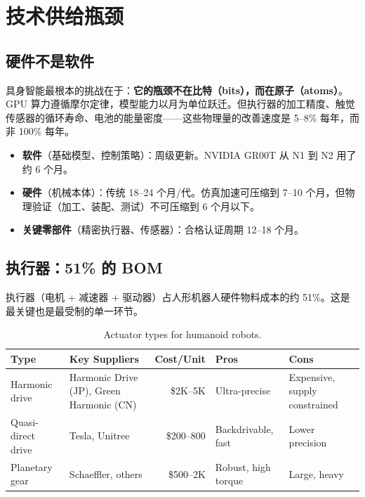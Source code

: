 \chapter{技术供给瓶颈}
\label{ch:technology}

\section{硬件不是软件}

具身智能最根本的挑战在于：\textbf{它的瓶颈不在比特（bits），而在原子（atoms）}。
GPU 算力遵循摩尔定律，模型能力以月为单位跃迁。但执行器的加工精度、触觉传感器的循环寿命、电池的能量密度——这些物理量的改善速度是 5--8\% 每年，而非 100\% 每年。

\begin{corebox}[硬件 vs 软件迭代周期]
\begin{itemize}
  \item \textbf{软件}（基础模型、控制策略）：周级更新。NVIDIA GR00T 从 N1 到 N2 用了约 6 个月。
  \item \textbf{硬件}（机械本体）：传统 18--24 个月/代。仿真加速可压缩到 7--10 个月\cite{humanoid2026hmnd}，但物理验证（加工、装配、测试）不可压缩到 6 个月以下。
  \item \textbf{关键零部件}（精密执行器、传感器）：合格认证周期 12--18 个月。
\end{itemize}
\end{corebox}

\section{执行器：51\% 的 BOM}

执行器（电机 + 减速器 + 驱动器）占人形机器人硬件物料成本的约 51\%\cite{techticker2026harmonic}。这是最关键也是最受制的单一环节。

\begin{table}[htbp]
\centering
\caption{Actuator types for humanoid robots.}
\label{tab:actuators}
\begin{tabularx}{\textwidth}{lXrll}
\toprule
\rowcolor{figLightGray}
\textbf{Type} & \textbf{Key Suppliers} & \textbf{Cost/Unit} & \textbf{Pros} & \textbf{Cons} \\
\midrule
Harmonic drive & Harmonic Drive (JP), Green Harmonic (CN) & \$2K--5K & Ultra-precise & Expensive, supply constrained \\
Quasi-direct drive & Tesla, Unitree & \$200--800 & Backdrivable, fast & Lower precision \\
Planetary gear & Schaeffler, others & \$500--2K & Robust, high torque & Large, heavy \\
\bottomrule
\end{tabularx}
\end{table}

